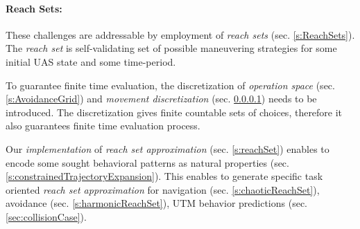 \paragraph{Reach Sets:} These challenges are addressable by employment of \emph{reach sets} (sec. \ref{s:ReachSets}). The \emph{reach set} is self-validating set of possible maneuvering strategies for some initial UAS state and some time-period. 

To guarantee finite time evaluation, the discretization of \emph{operation space} (sec. \ref{s:AvoidanceGrid}) and \emph{movement discretization} (sec. \ref{}) needs to be introduced. The discretization gives finite countable sets of choices, therefore it also guarantees finite time evaluation process.

Our \emph{implementation} of \emph{reach set approximation} (sec. \ref{s:reachSet}) enables to encode some sought behavioral patterns as natural properties (sec. \ref{s:constrainedTrajectoryExpansion}). This enables to generate specific task oriented \emph{reach set approximation} for navigation (sec. \ref{s:chaoticReachSet}), avoidance (sec. \ref{s:harmonicReachSet}), UTM behavior predictions (sec. \ref{sec:collisionCase}). 

